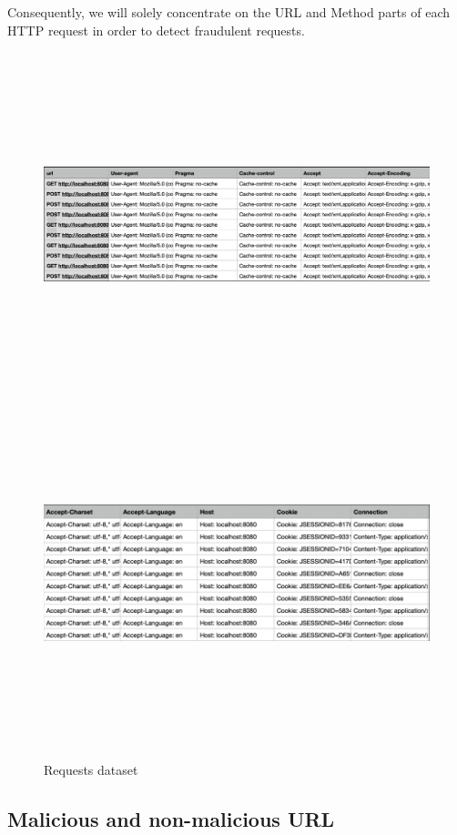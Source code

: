 Consequently, we will solely concentrate on the URL and Method parts of each HTTP request in order to detect fraudulent requests.

\begin{figure}[ht]
	\centering
	\includegraphics[width=\linewidth, height=10cm,keepaspectratio]{figures/dataset part1.PNG}
	\includegraphics[width=\linewidth, height=10cm,keepaspectratio]{figures/dataset part2.PNG}
  \caption{Requests dataset}
\end{figure}

\newpage
\subsection{Malicious and non-malicious URL}

